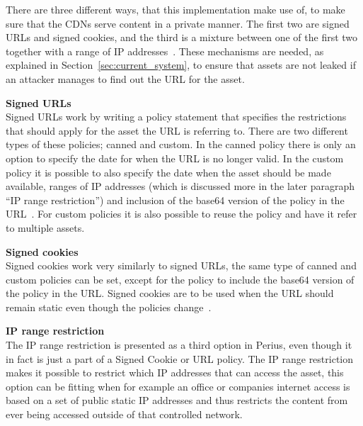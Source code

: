 \documentclass[a4paper,12pt]{article}
\newcounter{subsubsubsection}[subsubsection]
\begin{document}
 \label{sec:private_content}
There are three different ways, that this implementation make use of, to make sure that the CDNs
serve content in a private manner. The first two are signed URLs and signed cookies, and the third
is a mixture between one of the first two together with a range of IP addresses~\cite{AWSPRIVATE}.
These mechanisms are needed, as explained in Section~\ref{sec:current_system}, to ensure that assets
are not leaked if an attacker manages to find out the URL for the asset. \\

\par \textbf{Signed URLs} \\
Signed URLs work by writing a policy statement that specifies the restrictions that should apply for
the asset the URL is referring to. There are two different types of these policies; canned and
custom. In the canned policy there is only an option to specify the date for when the URL is no
longer valid. In the custom policy it is possible to also specify the date when the asset should be
made available, ranges of IP addresses (which is discussed more in the later paragraph ``IP range
restriction'') and inclusion of the base64 version of the policy in the URL~\cite{AWSSIGNED}. For
custom policies it is also possible to reuse the policy and have it refer to multiple assets.\\

\par \textbf{Signed cookies} \\
Signed cookies work very similarly to signed URLs, the same type of canned and custom policies can
be set, except for the policy to include the base64 version of the policy in the URL. Signed cookies
are to be used when the URL should remain static even though the policies change~\cite{AWSCOOKIES}.
\\

\par \textbf{IP range restriction} \\
The IP range restriction is presented as a third option in Perius, even though it in fact is just a
part of a Signed Cookie or URL policy. The IP range restriction makes it possible to restrict which
IP addresses that can access the asset, this option can be fitting when for example an office or
companies internet access is based on a set of public static IP addresses and thus restricts the
content from ever being accessed outside of that controlled network.
\end{document}
